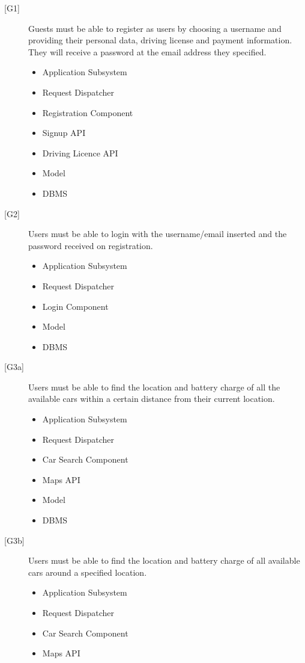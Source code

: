 \documentclass[english]{article}
\begin{document}
\begin{itemize}
\begin{description}
	\item[{[G1]}]{Guests must be able to register as users by choosing a username and providing their personal data, driving license and payment information. They will receive a password at the email address they specified.}
	\begin{itemize}
		\item{Application Subsystem}
		\item{Request Dispatcher}
		\item{Registration Component}
		\item{Signup API}
		\item{Driving Licence API}
		\item{Model}
		\item{DBMS}
	\end{itemize}
	\item[{[G2]}]{Users must be able to login with the username/email inserted and the password received on registration.}
	\begin{itemize}
		\item{Application Subsystem}
		\item{Request Dispatcher}
		\item{Login Component}
		\item{Model}
		\item{DBMS}
	\end{itemize}
	\item[{[G3a]}]{Users must be able to find the location and battery charge of all the available cars within a certain distance from their current location.}
	\begin{itemize}
		\item{Application Subsystem}
		\item{Request Dispatcher}
		\item{Car Search Component}
		\item{Maps API}
		\item{Model}
		\item{DBMS}
	\end{itemize}
	\item[{[G3b]}]{Users must be able to find the location and battery charge of all available cars around a specified location.}
	\begin{itemize}
		\item{Application Subsystem}
		\item{Request Dispatcher}
		\item{Car Search Component}
		\item{Maps API}

\end{itemize}
\end{description}
\end{itemize}
\end{document}
